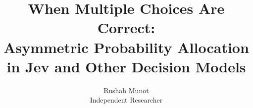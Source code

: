 \documentclass[11pt]{article}
\title{When Multiple Choices Are Correct:\\Asymmetric Probability Allocation in Jev and Other Decision Models}
\author{%
  Rushab Munot \\
  Independent Researcher \\
}
\begin{document}
\maketitle

\begin{abstract}

\end{abstract}















\appendix




\end{document}

